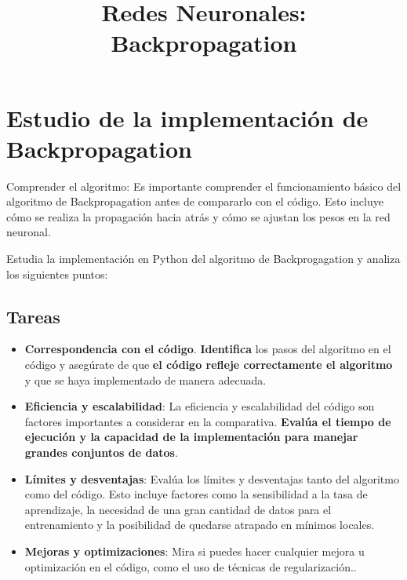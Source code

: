 \documentclass[11pt]{article}
\date{}
\title{Redes Neuronales: Backpropagation}
\begin{document}
\maketitle
\setlength\parindent{10pt}


\section*{Estudio de la implementación de Backpropagation}
\label{sec:org31f8a86}

Comprender el algoritmo: Es importante comprender el funcionamiento
básico del algoritmo de Backpropagation antes de compararlo con el
código. Esto incluye cómo se realiza la propagación hacia atrás y cómo
se ajustan los pesos en la red neuronal.

Estudia la implementación en Python del algoritmo de Backprogagation y
analiza los siguientes puntos:


\subsection*{Tareas}
\label{sec:org45244c6}
\begin{itemize}
\item \textbf{Correspondencia con el código}. \textbf{Identifica} los pasos del
algoritmo en el código y asegúrate de que \textbf{el código refleje
correctamente el algoritmo} y que se haya implementado de manera
adecuada.

\item \textbf{Eficiencia y escalabilidad}: La eficiencia y escalabilidad del
código son factores importantes a considerar en la
comparativa. \textbf{Evalúa el tiempo de ejecución y la capacidad de la
implementación para manejar grandes conjuntos de datos}.

\item \textbf{Límites y desventajas}: Evalúa los límites y desventajas tanto
del algoritmo como del código. Esto incluye factores como la
sensibilidad a la tasa de aprendizaje, la necesidad de una gran
cantidad de datos para el entrenamiento y la posibilidad de
quedarse atrapado en mínimos locales.

\item \textbf{Mejoras y optimizaciones}: Mira si puedes hacer cualquier mejora u
optimización en el código, como el uso de técnicas de
regularización..
\end{itemize}
\end{document}
